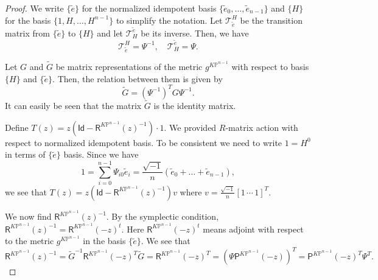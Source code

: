 \documentclass[12pt]{amsart}
\numberwithin{equation}{section}
\newcommand{\KP}{K\mathbb{P}}
\begin{document}
\begin{proof}
We write $\{\tilde{e}\}$ for the normalized idempotent basis $\{\tilde{e}_0,\ldots,\tilde{e}_{n-1}\}$ and $\{H\}$ for the basis $\{1,H,\ldots,H^{n-1}\}$ to simplify the notation. Let $\mathcal{T}_{\tilde{e}}^{H}$ be the transition matrix from $\{\tilde{e}\}$ to $\{H\}$ and let $\mathcal{T}_{H}^{\tilde{e}}$ be its inverse. Then, we have $$\mathcal{T}_{\tilde{e}}^{H}=\Psi^{-1},\quad \mathcal{T}_{H}^{\tilde{e}}=\Psi.$$

Let $G$ and $\widetilde{G}$ be matrix representations of the metric $g^{\KP^{n-1}}$ with respect to basis $\{H\}$ and  $\{\tilde{e}\}$. Then, the relation between them is given by
\begin{equation}\label{eq:contproofeq1}
\widetilde{G}=\left(\Psi^{-1}\right)^TG\Psi^{-1}.
\end{equation}
It can easily be seen that the matrix $\widetilde{G}$ is the identity matrix.

Define $T(z)=z\left(\mathsf{Id}-\mathsf{R}^{\KP^{n-1}}(z)^{-1}\right)\cdot{1}$. We provided $R$-matrix action with respect to normalized idempotent basis. To be consistent we need to write $1=H^0$ in terms of $\{\tilde{e}\}$ basis. Since we have
\begin{equation}\label{eq:contproofeq2}
1=\sum_{i=0}^{n-1}\Psi_{i0}\tilde{e}_i=\frac{\sqrt{-1}}{n}\left(\tilde{e}_0+\ldots+\tilde{e}_{n-1}\right),
\end{equation}
we see that $T(z)=z\left(\mathsf{Id}-\mathsf{R}^{\KP^{n-1}}(z)^{-1}\right)v$ where $v=\frac{\sqrt{-1}}{n}[1\,\cdots\, 1]^T$.

We now find $\mathsf{R}^{\KP^{n-1}}(z)^{-1}$. By the symplectic condition, $\mathsf{R}^{\KP^{n-1}}(z)^{-1}=\mathsf{R}^{\KP^{n-1}}(-z)^{t}$. Here $\mathsf{R}^{\KP^{n-1}}(-z)^{t}$ means adjoint with respect to the metric $g^{\KP^{n-1}}$ in the basis $\{\tilde{e}\}$. We see that
\begin{equation}\label{eq:contproofeq3}
\mathsf{R}^{\KP^{n-1}}(z)^{-1}=\widetilde{G}^{-1}\mathsf{R}^{\KP^{n-1}}(-z)^{T}\widetilde{G}=\mathsf{R}^{\KP^{n-1}}(-z)^{T}=\left(\Psi \mathsf{P}^{\KP^{n-1}}(-z)\right)^T=\mathsf{P}^{\KP^{n-1}}(-z)^T\Psi^T.
\end{equation}


\end{proof}
\end{document}

